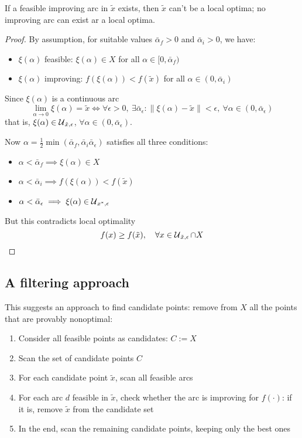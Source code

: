 If a feasible improving arc in $\tilde x$ exists, then $\tilde x$ can't be a local optima; no improving arc can exist ar a local optima.

\begin{proof}
	By assumption, for suitable values $\bar \alpha_f > 0$ and $\bar \alpha_i > 0$, we have:
	\begin{itemize}
		\item $\xi (\alpha)$ feasible: $\xi (\alpha) \in X$ for all $\alpha \in [0, \bar \alpha_f)$
		
		\item $\xi (\alpha)$ improving: $f(\xi(\alpha))  < f(\tilde x)$ for all $\alpha \in (0, \bar \alpha_i)$
	\end{itemize}
	
	Since $\xi (\alpha)$ is a continuous arc 
	$$ \lim_{\alpha \rightarrow 0} \xi(\alpha) = \tilde x \Leftrightarrow \forall \epsilon > 0, \ \exists \bar \alpha_\epsilon  : \| \xi(\alpha)  - \tilde x \| < \epsilon, \ \forall \alpha \in (0, \bar \alpha_\epsilon ) $$
	that is, $\xi (\alpha) \in \operatorname{\mathcal{U}}_{\tilde x, \epsilon}$, $\forall \alpha \in (0, \bar \alpha_\epsilon )$.
	
	Now $\alpha = \frac{1}{2} \min (\bar \alpha_f, \bar \alpha_i \bar \alpha_\epsilon )$ satisfies all three conditions: 
	\begin{itemize}
		\item $\alpha < \bar \alpha_f \implies \xi(\alpha) \in X$
		
		\item $\alpha < \bar \alpha_i \implies f(\xi(\alpha)) < f(\tilde x)$
		
		\item $\alpha < \bar \alpha_\epsilon \implies \xi(\alpha) \in \operatorname{\mathcal{U}}_{x^\ast, \epsilon}$
	\end{itemize}
	But this contradicts local optimality
	$$ f(x) \geq f(\tilde x), \quad \forall x \in \operatorname{\mathcal{U}}_{\tilde x, \epsilon}  \cap X $$
\end{proof}

\subsection{A filtering approach}
\label{subsec:filteringapproach}

This suggests an approach to find candidate points: remove from $X$ all the points that are provably nonoptimal:
\begin{enumerate}
	\item Consider all feasible points as candidates: $C := X$
	
	\item Scan the set of candidate points $C$
	
	\item For each candidate point $\tilde x$, scan all feasible arcs
	
	\item For each arc $d$ feasible in $\tilde x$, check whether the arc is improving for $f(\cdot)$: if it is, remove $\tilde x$ from the candidate set
	
	\item In the end, scan the remaining candidate points, keeping only the best ones
\end{enumerate}

